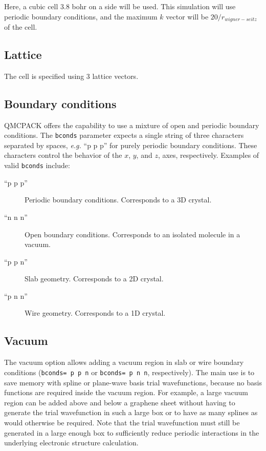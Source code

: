 Here, a cubic cell 3.8 bohr on a side will be used.
This simulation will use periodic boundary conditions, and the maximum
$k$ vector will be $20/r_{wigner-seitz}$ of the cell.


\subsection{Lattice}
The cell is specified using 3 lattice vectors.


\subsection{Boundary conditions}
QMCPACK offers the capability to use a mixture of open and periodic boundary conditions.
The \texttt{bconds} parameter expects a single string of three characters separated by
spaces, \textit{e.g.} ``p p p'' for purely periodic boundary conditions. These characters control
the behavior of the $x$, $y$, and $z$, axes, respectively.
Examples of valid \texttt{bconds} include:

\begin{description}
\item[``p p p''] Periodic boundary conditions. Corresponds to a 3D crystal.
\item[``n n n''] Open boundary conditions. Corresponds to an isolated molecule in a vacuum.
\item[``p p n''] Slab geometry. Corresponds to a 2D crystal.
\item[``p n n''] Wire geometry. Corresponds to a 1D crystal.
\end{description}

\subsection{Vacuum}
The vacuum option allows adding a vacuum region in slab or wire boundary conditions
(\texttt{bconds= p p n} or \texttt{bconds= p n n}, respectively). The main use is
to save memory with spline or plane-wave basis trial wavefunctions, because no basis
functions are required inside the vacuum region. For example, a large vacuum region
can be added above and below a graphene sheet without having to generate the trial
wavefunction in such a large box or to have as many splines as would otherwise
be required. Note that the trial wavefunction must still be generated in a
large enough box to sufficiently reduce periodic interactions in the underlying
electronic structure calculation.

